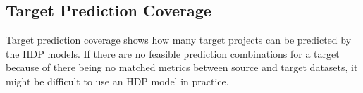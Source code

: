 % 
% 
% 
% 
% 

\subsection{Target Prediction Coverage}
\label{subsec02}
Target prediction coverage shows how many target projects can be
predicted by the HDP models. If there are no feasible prediction
combinations for a target because of there being no matched metrics
between source and target datasets, it might be difficult to use an HDP model in
practice.

